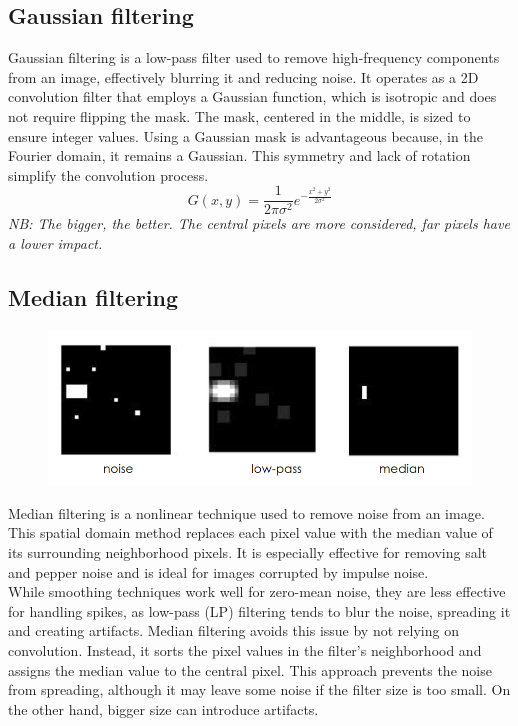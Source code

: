 \subsection{Gaussian filtering}
Gaussian filtering is a low-pass filter used to remove high-frequency components from an image, effectively blurring it and reducing noise. 
It operates as a 2D convolution filter that employs a Gaussian function, which is isotropic and does not require flipping the mask. 
The mask, centered in the middle, is sized to ensure integer values. 
Using a Gaussian mask is advantageous because, in the Fourier domain, it remains a Gaussian. 
This symmetry and lack of rotation simplify the convolution process.
\[
    G(x,y) = \frac{1}{2\pi\sigma^2}e^{-\frac{x^2+y^2}{2\sigma^2}}
\]
\textit{NB: The bigger, the better. The central pixels are more considered, far pixels have a lower impact.}
\subsection{Median filtering}
\begin{figure}[h]
    \centering
    \includegraphics[scale=0.5]{Figures/Noise.png}
    \label{fig:enter-label}
\end{figure}
Median filtering is a nonlinear technique used to remove noise from an image. This spatial domain method replaces each pixel value with the median value of its surrounding neighborhood pixels. 
It is especially effective for removing salt and pepper noise and is ideal for images corrupted by impulse noise.
\\
While smoothing techniques work well for zero-mean noise, they are less effective for handling spikes, as low-pass (LP) filtering tends to blur the noise, spreading it and creating artifacts. 
Median filtering avoids this issue by not relying on convolution. 
Instead, it sorts the pixel values in the filter's neighborhood and assigns the median value to the central pixel. 
This approach prevents the noise from spreading, although it may leave some noise if the filter size is too small. On the other hand, bigger size can introduce artifacts.
